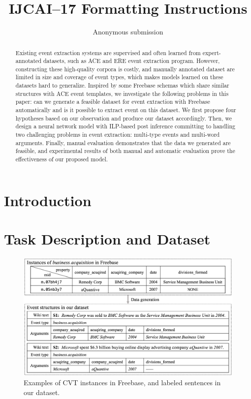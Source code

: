 \documentclass{article}
\title{IJCAI--17 Formatting Instructions}
\author{Anonymous submission}
\begin{document}
\maketitle

\begin{abstract}
Existing event extraction systems are supervised and often learned from expert-annotated datasets, such as ACE and ERE event extraction program. However, constructing these high-quality corpora is costly, and 
manually annotated dataset are limited in size and coverage of event types, which makes models learned on these datasets hard to generalize. Inspired by some Freebase schemas which share similar structures with ACE event templates, we investigate the following problems in this paper: can we generate a feasible dataset for event extraction with Freebase automatically and is it possible to extract event on this dataset. We first propose four hypotheses based on our observation and produce our dataset accordingly. Then, we design a neural network model with ILP-based post inference committing to handling two challenging problems in event extraction: multi-type events and multi-word arguments. Finally, manual evaluation demonstrates that the data we generated are feasible, and experimental results of both manual and automatic evaluation prove the effectiveness of our proposed model.
\end{abstract}

\section{Introduction}

\section{Task Description and Dataset}
\begin{figure}[h]
	\includegraphics[width=.5\textwidth]{temp}
	\caption{Examples of CVT instances in Freebase, and labeled sentences in our dataset. \label{fig:3}}
\end{figure}
\end{document}
